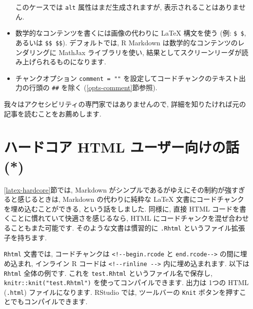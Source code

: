 \documentclass[
  11pt,
  lualatex,ja=standard,jafont=noto]{bxjsreport}
\begin{document}
\begin{itemize}
  このケースでは \texttt{alt} 属性はまだ生成されますが, 表示されることはありません.
\item
  数学的なコンテンツを書くには画像の代わりに LaTeX 構文を使う (例: \texttt{\$ \$}, あるいは \texttt{\$\$ \$\$}). デフォルトでは, R Markdown は数学的なコンテンツのレンダリングに MathJax ライブラリを使い, 結果としてスクリーンリーダが読み上げられるものになります.
\item
  チャンクオプション \texttt{comment = ""} を設定してコードチャンクのテキスト出力の行頭の \texttt{\#\#} を除く (\ref{opts-comment}節参照).
\end{itemize}

我々はアクセシビリティの専門家ではありませんので, 詳細を知りたければ元の記事を読むことをお薦めします.

\hypertarget{html-hardcore}{%
\section{ハードコア HTML ユーザー向けの話 (*)}\label{html-hardcore}}

\ref{latex-hardcore}節では, Markdown がシンプルであるがゆえにその制約が強すぎると感じるときは, Markdown の代わりに純粋な LaTeX 文書にコードチャンクを埋め込むことができる, という話をしました. 同様に, 直接 HTML コードを書くことに慣れていて快適さを感じるなら, HTML にコードチャンクを混ぜ合わせることもまた可能です. そのような文書は慣習的に \texttt{.Rhtml} というファイル拡張子を持ちます.

\texttt{Rhtml} 文書では, コードチャンクは \texttt{\textless{}!-\/-begin.rcode} と \texttt{end.rcode-\/-\textgreater{}} の間に埋め込まれ, インライン R コードは \texttt{\textless{}!-\/-rinline\ -\/-\textgreater{}} 内に埋め込まれます. 以下は \texttt{Rhtml} 全体の例です. これを \texttt{test.Rhtml} というファイル名で保存し, \texttt{knitr::knit("test.Rhtml")} を使ってコンパイルできます. 出力は 1つの HTML (\texttt{.html}) ファイルになります. RStudio では, ツールバーの \texttt{Knit} ボタンを押すことでもコンパイルできます.
\end{document}
